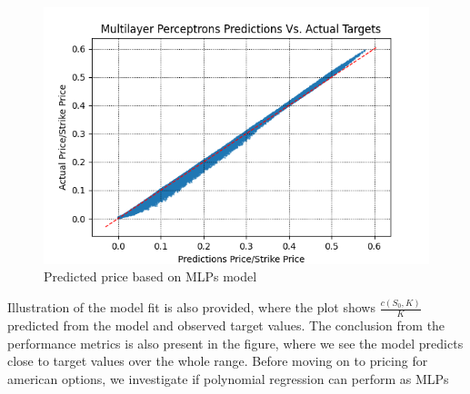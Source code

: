 \begin{figure}[th]
\centering
\includegraphics{Figures/PredictionEuroC.png}
\decoRule
\caption[MLPs Predictions Vs. Actual Prices]{Predicted price based on MLPs model}
\label{fig:MLPsEuroC}
\end{figure}

Illustration of the model fit is also provided, where the plot shows $\frac{c(S_0,K)}{K}$ predicted from the model and observed target values. The conclusion from the performance metrics is also present in the figure, where we see the model predicts close to target values over the whole range. Before moving on to pricing for american options, we investigate if polynomial regression can perform as MLPs

